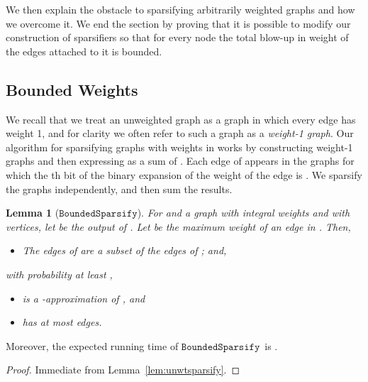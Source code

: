 \documentclass[11pt]{article}
\newtheorem{lemma}[theorem]{Lemma}
\newcommand{\boundedsparsify}{\ensuremath{\mathtt{BoundedSparsify}}}
\begin{document}
We then explain the obstacle to sparsifying arbitrarily weighted graphs
  and how we overcome it.
We end the section by proving that it is possible to modify our construction
  of sparsifiers
  so that for every node the total blow-up in weight of the edges attached to
  it is bounded.

\subsection{Bounded Weights}

We recall that we treat an unweighted graph as a graph in which every edge has
  weight 1, and for clarity we often refer to such a graph as a
  \textit{weight-1 graph}.
Our algorithm for sparsifying graphs with weights in
   works by constructing
   weight-1 graphs  and then expressing
   as a sum of .
Each edge of  appears in the graphs  for which the th   
  bit of the binary expansion of the weight of the edge is .
We sparsify the graphs  independently, and then sum the results.

\vskip 0.2in
\noindent
{}
\vskip 0.2in

\begin{lemma}[\boundedsparsify]\label{lem:boundedsparsify}
For  and a graph  with integral weights
  and with  vertices, let
 be the output of .
Let  be the maximum weight of an edge in .
Then,
\begin{itemize}
\item [(B.1)] The edges of  are a subset of the edges of ; and,
\end{itemize}
with probability at least ,
\begin{itemize}
\item [(B.2)]  is a -approximation of , and
\item [(B.3)]  has at most 
  edges.
\end{itemize}
\end{lemma}
Moreover, the expected running time of \boundedsparsify  \ is 
  .
\begin{proof}
Immediate from Lemma~\ref{lem:unwtsparsify}.
\end{proof}
\end{document}
